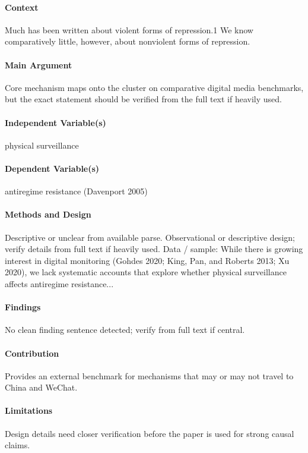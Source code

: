\documentclass[12pt]{article}
\begin{document}
\paragraph{Context} Much has been written about violent forms of repression.1 We know comparatively little, however, about nonviolent forms of repression.

\paragraph{Main Argument} Core mechanism maps onto the cluster on comparative digital media benchmarks, but the exact statement should be verified from the full text if heavily used.

\paragraph{Independent Variable(s)} physical surveillance

\paragraph{Dependent Variable(s)} antiregime resistance (Davenport 2005)

\paragraph{Methods and Design} Descriptive or unclear from available parse. Observational or descriptive design; verify details from full text if heavily used. Data / sample: While there is growing interest in digital monitoring (Gohdes 2020; King, Pan, and Roberts 2013; Xu 2020), we lack systematic accounts that explore whether physical surveillance affects antiregime resistance...

\paragraph{Findings} No clean finding sentence detected; verify from full text if central.

\paragraph{Contribution} Provides an external benchmark for mechanisms that may or may not travel to China and WeChat.

\paragraph{Limitations} Design details need closer verification before the paper is used for strong causal claims.
\end{document}
